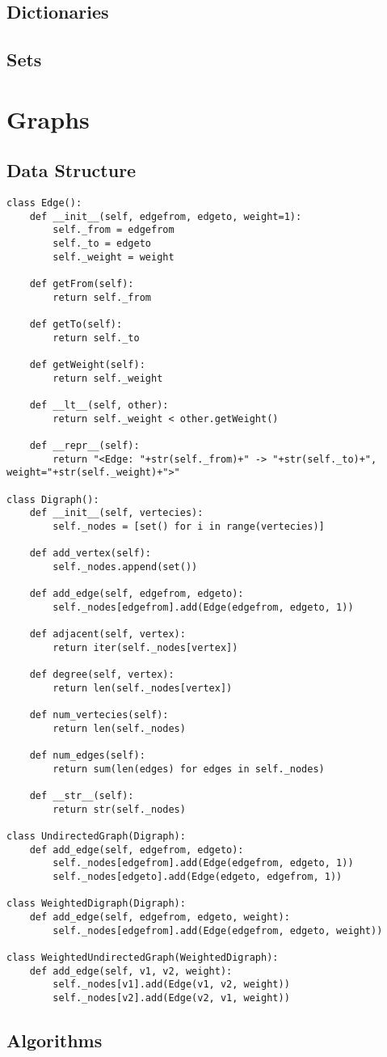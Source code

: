 \documentclass[12pt]{article}
\begin{document}
\subsection{Dictionaries}

\subsection{Sets}

\section{Graphs}
\subsection{Data Structure}
\begin{lstlisting}
class Edge():
	def __init__(self, edgefrom, edgeto, weight=1):
		self._from = edgefrom
		self._to = edgeto
		self._weight = weight

	def getFrom(self):
		return self._from

	def getTo(self):
		return self._to

	def getWeight(self):
		return self._weight

	def __lt__(self, other):
		return self._weight < other.getWeight()

	def __repr__(self):
		return "<Edge: "+str(self._from)+" -> "+str(self._to)+", weight="+str(self._weight)+">"

class Digraph():
	def __init__(self, vertecies):
		self._nodes = [set() for i in range(vertecies)]

	def add_vertex(self):
		self._nodes.append(set())

	def add_edge(self, edgefrom, edgeto):
		self._nodes[edgefrom].add(Edge(edgefrom, edgeto, 1))

	def adjacent(self, vertex):
		return iter(self._nodes[vertex])

	def degree(self, vertex):
		return len(self._nodes[vertex])

	def num_vertecies(self):
		return len(self._nodes)

	def num_edges(self):
		return sum(len(edges) for edges in self._nodes)

	def __str__(self):
		return str(self._nodes)

class UndirectedGraph(Digraph):
	def add_edge(self, edgefrom, edgeto):
		self._nodes[edgefrom].add(Edge(edgefrom, edgeto, 1))
		self._nodes[edgeto].add(Edge(edgeto, edgefrom, 1))

class WeightedDigraph(Digraph):
	def add_edge(self, edgefrom, edgeto, weight):
		self._nodes[edgefrom].add(Edge(edgefrom, edgeto, weight))

class WeightedUndirectedGraph(WeightedDigraph):
	def add_edge(self, v1, v2, weight):
		self._nodes[v1].add(Edge(v1, v2, weight))
		self._nodes[v2].add(Edge(v2, v1, weight))
\end{lstlisting}

\subsection{Algorithms}
\end{document}
